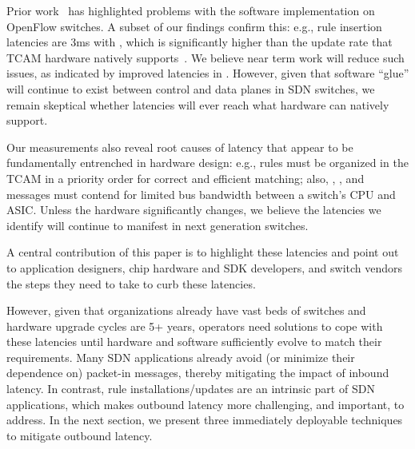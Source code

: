 \fi

Prior work~\cite{ucsdpaper,oflops} has highlighted problems with the software
implementation on OpenFlow switches. A subset of our findings confirm this:
e.g., rule insertion latencies are 3ms with \BroadcomOne, which is significantly higher than the 
update rate that TCAM hardware natively supports~\cite{estan:private}. 
We believe near term work will reduce such issues, as indicated by
improved latencies in \BroadcomThree. 
However, given that software ``glue'' will continue to exist between 
control and data planes in SDN switches, we remain skeptical whether 
latencies will ever reach what hardware can natively support.


Our measurements also reveal root causes of latency that appear to be
fundamentally entrenched in hardware design: e.g., rules 
must be organized in the TCAM in a priority order for correct and efficient matching; 
also, \packetin, \flowmod, and \packetout messages must contend for limited
bus bandwidth between a switch's CPU and ASIC. Unless the hardware
significantly changes, we believe the latencies we identify
will continue to manifest in next generation switches.  

A central contribution of this paper is to highlight these latencies and
point out to application designers, chip hardware and SDK developers, and
switch vendors the steps they need to take to curb these latencies. 

However, given that organizations already have vast beds of switches and
hardware upgrade cycles are 5+ years, operators need solutions to cope
with these latencies until hardware and software sufficiently evolve to match
their requirements.  
Many SDN applications already avoid (or minimize their dependence on) packet-in 
messages, thereby mitigating the impact of inbound latency. In contrast, rule
installations/updates are an intrinsic part of SDN applications, which makes
outbound latency more challenging, and important, to address.
In the next section, we present three immediately deployable techniques to 
mitigate outbound latency.

